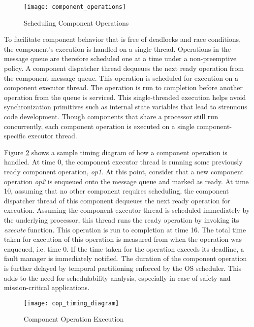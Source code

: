 \vspace{-0.12in}
\begin{figure}[ht]
\centering
\texttt{[image: component\_operations]}
\caption{Scheduling Component Operations}
\label{fig:component_operations}
\vspace{-0.18in}
\end{figure}

To facilitate component behavior that is free of deadlocks and race conditions, the component's execution is handled on a single thread. Operations in the message queue are therefore scheduled one at a time under a non-preemptive policy. A component dispatcher thread dequeues the next ready operation from the component message queue. This operation is scheduled for execution on a component executor thread. The operation is run to completion before another operation from the queue is serviced. This single-threaded execution helps avoid synchronization primitives such as internal state variables that lead to strenuous code development. Though components that share a processor still run concurrently, each component operation is executed on a single component-specific executor thread.

Figure \ref{fig:timing_diagram} shows a sample timing diagram of how a component operation is handled. At time 0, the component executor thread is running some previously ready component operation, \emph{op1}. At this point, consider that a new component operation \emph{op2} is enqueued onto the message queue and marked as ready. At time 10, assuming that no other component requires scheduling, the component dispatcher thread of this component dequeues the next ready operation for execution. Assuming the component executor thread is scheduled immediately by the underlying processor, this thread runs the ready operation by invoking its \emph{execute} function. This operation is run to completion at time 16. The total time taken for execution of this operation is measured from when the operation was enqueued, i.e. time 0. If the time taken for the operation exceeds its deadline, a fault manager is immediately notified. The duration of the component operation is further delayed by temporal partitioning enforced by the OS scheduler. This adds to the need for schedulability analysis, especially in case of safety and mission-critical applications.

\begin{figure}[ht]
\centering
\texttt{[image: cop\_timing\_diagram]}
\caption{Component Operation Execution}
\label{fig:timing_diagram}
\vspace{-0.2in}
\end{figure}
\vspace{0.1in}

